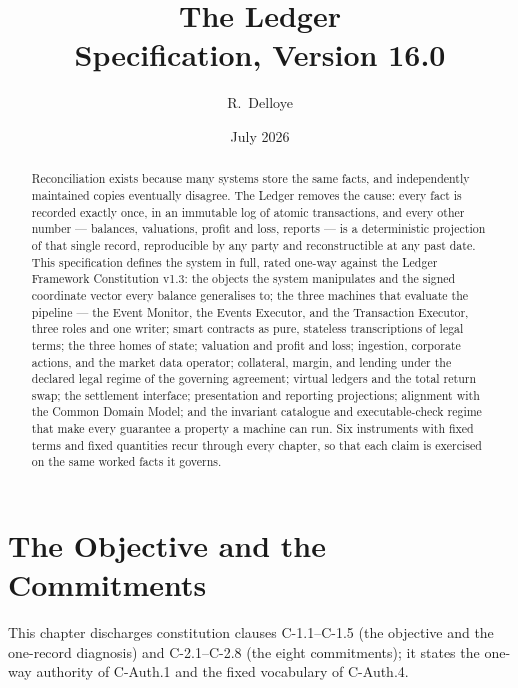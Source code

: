 \documentclass[11pt,a4paper]{article}
\title{The Ledger\\[6pt]
\large Specification, Version 16.0}
\author{R.\ Delloye}
\date{July 2026}
\begin{document}
\maketitle

\begingroup
\setlength{\parskip}{0pt}
\tableofcontents
\endgroup
\clearpage


\begin{abstract}
Reconciliation exists because many systems store the same facts, and independently
maintained copies eventually disagree. The Ledger removes the cause: every fact is
recorded exactly once, in an immutable log of atomic transactions, and every other
number --- balances, valuations, profit and loss, reports --- is a deterministic
projection of that single record, reproducible by any party and reconstructible at any
past date. This specification defines the system in full, rated one-way against the
Ledger Framework Constitution v1.3: the objects the system manipulates and the signed
coordinate vector every balance generalises to; the three machines that evaluate the
pipeline --- the Event Monitor, the Events Executor, and the Transaction Executor,
three roles and one writer; smart contracts as pure, stateless transcriptions of legal
terms; the three homes of state; valuation and profit and loss; ingestion, corporate
actions, and the market data operator; collateral, margin, and lending under the
declared legal regime of the governing agreement; virtual ledgers and the total return
swap; the settlement interface; presentation and reporting projections; alignment with
the Common Domain Model; and the invariant catalogue and executable-check regime that
make every guarantee a property a machine can run. Six instruments with fixed terms
and fixed quantities recur through every chapter, so that each claim is exercised on
the same worked facts it governs.
\end{abstract}

\tableofcontents
\clearpage

\section{The Objective and the Commitments}\label{ch:objective}

This chapter discharges constitution clauses C-1.1--C-1.5 (the objective and the one-record diagnosis) and C-2.1--C-2.8 (the eight commitments); it states the one-way authority of C-Auth.1 and the fixed vocabulary of C-Auth.4.
\end{document}
